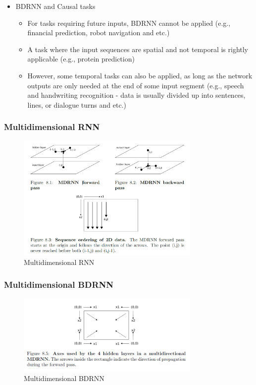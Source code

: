\documentclass{beamer}
\begin{document}
\frame
{
    \begin{itemize}
        \item BDRNN and Causal tasks 
            \begin{itemize} 
                \item For tasks requiring future inputs, BDRNN cannot be applied (e.g., financial prediction, robot navigation and etc.)  
                \item A task where the input sequences are spatial and not temporal is rightly applicable (e.g., protein prediction)
                \item However, some temporal tasks can also be applied, as long as the network outputs are only needed at the end of some input segment (e.g., speech and handwriting recognition - data is usually divided up into sentences, lines, or dialogue turns and etc.)
            \end{itemize}
    \end{itemize}
}
\frame
{
    \frametitle{Multidimensional RNN}
	\begin{figure}[ht]  
		\begin{center}
			\includegraphics[width=3.5in]{Images/multidimensional_rnn.png}   
		\end{center}   
		\caption{Multidimensional RNN}
	\end{figure}
}
\frame
{
    \frametitle{Multidimensional BDRNN}
	\begin{figure}[ht]  
		\begin{center}
			\includegraphics[width=3.5in]{Images/multidimensional_bdrnn.png}   
		\end{center}   
		\caption{Multidimensional BDRNN}
	\end{figure}
}
\end{document}
